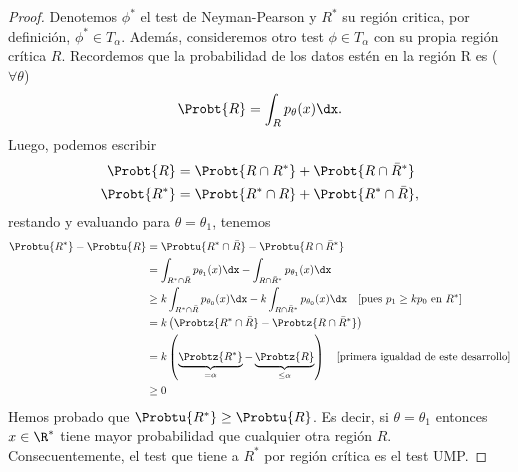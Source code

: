 \begin{proof}
	Denotemos $\phi^*$ el test de Neyman-Pearson y $R^*$ su región critica, por definición, $\phi^*\in T_\alpha$. Además, consideremos otro test $\phi\in T_\alpha$ con su propia región crítica $R$. Recordemos que  la probabilidad de los datos estén en la región R es ($\forall \theta$)
	\begin{equation}
		\Probt{R} = \int_R p_\theta(x)\dx.
	\end{equation}
	Luego, podemos escribir 
	\begin{align}
		\Probt{R} &= \Probt{R\cap R^*} + \Probt{R\cap \bar{R}^*}\\
		\Probt{R^*} &= \Probt{R^*\cap R} + \Probt{R^*\cap \bar{R}},
	\end{align}
	restando y evaluando para $\theta=\theta_1$, tenemos
	\begin{align}
	\Probtu{R^*} - \Probtu{R} 	&=  \Probtu{R^*\cap \bar{R}} - \Probtu{R\cap \bar{R}^*}\nonumber \\
								&=  \int_{R^*\cap \bar{R}} p_{\theta_1}(x)\dx - \int_{R\cap \bar{R}^*} p_{\theta_1}(x)\dx\nonumber\\
									&\geq  k\int_{R^*\cap \bar{R}} p_{\theta_0}(x)\dx - k\int_{R\cap \bar{R}^*} p_{\theta_0}(x)\dx \quad[\text{pues } p_1\geq k p_0 \text{ en } R^*]\nonumber\\
									&= k\left( \Probtz{R^*\cap \bar{R}} - \Probtz{R\cap \bar{R}^*}\right)\nonumber \\
									&= k\left( \underbrace{\Probtz{R^*}}_{=\alpha} - \underbrace{\Probtz{R}}_{\leq\alpha}\right) \quad[\text{primera igualdad de este desarrollo}]\nonumber\\
									&\geq 0
	\end{align}
	Hemos probado que $\Probtu{R^*} \geq \Probtu{R}$. Es decir, si $\theta = \theta_1$ entonces $x\in\R^*$ tiene mayor probabilidad que cualquier otra región $R$. Consecuentemente,  el test que tiene a $R^*$ por región crítica es el test UMP.

	
\end{proof}


